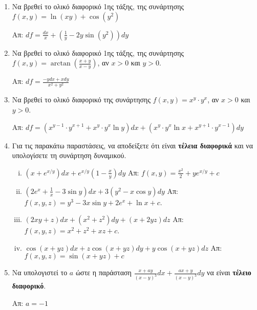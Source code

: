 \begin{enumerate}

  \item Να βρεθεί το ολικό διαφορικό 1ης τάξης, της συνάρτησης 
    $f(x,y)=\ln(xy)+\cos(y^2)$ 

    \hfill Απ: $df=\frac{dx}{x}+\left(\frac{1}{y}-2y\sin(y^2)\right)dy$

  \item Να βρεθεί το ολικό διαφορικό 1ης τάξης, της συνάρτησης 
    $ f(x,y) = \arctan(\frac{ x+y }{ x-y }) $, αν $ x>0 $ και $ y>0 $.

    \hfill Απ: $df = \frac{ -ydx + xdy }{ x^{2} + y^{2} } $ 

  \item Να βρεθεί το ολικό διαφορικό της συνάρτησης $ f(x,y) = x^{y} \cdot y^{x} $, 
    αν $ x>0$ και $ y>0 $.

    \hfill Απ: $df =  (x^{y-1}\cdot y^{x+1} + x^{y}\cdot y^{x} \ln{y} )dx 
    + (x^{y}\cdot y^{x} \ln{x} + x^{y+1} \cdot y^{x-1})dy $ 

  \item Για τις παρακάτω παραστάσεις, να αποδείξετε ότι είναι \textbf{τέλεια
    διαφορικά} και να υπολογίσετε τη συνάρτηση δυναμικού.
    \begin{enumerate}[i)]
      \item $ \left(x+e^{x/y}\right)dx + e^{x/y}\left(1- \frac{x}{y}\right)dy $
        \hfill Απ: $ f(x,y) = \frac{x^{2}}{2} +y e^{x/y} + c $ 

      \item $\left(2e^{x}+\frac{1}{x}-3\sin y\right)dx+3(y^2-x\cos y)dy$ 
        \hfill  Απ: $ f(x,y,z) = y^{3}-3x \sin{y} + 2e^{x} + \ln{x} +c $.

      \item $(2xy+z)dx+(x^{2}+z^{2})dy+(x+2yz)dz$ 
        \hfill  Απ: $ f(x,y,z) = x^{2}+z^{2}+xz +c $.


      \item $ \cos(x+yz)dx + z\cos(x+yz)dy+y\cos(x+yz)dz $
        \hfill Απ: $ f(x,y,z) = \sin(x+yz) + c $
    \end{enumerate}

  \item Να υπολογιστεί το $a$ ώστε η παράσταση $ \frac{ x + ay }{ (x-y)^{3} }dx 
    + \frac{ ax+y }{ (x-y)^{3} }dy $ να είναι \textbf{τέλειο διαφορικό}.

    \hfill Απ: $ a=-1 $
\end{enumerate}

